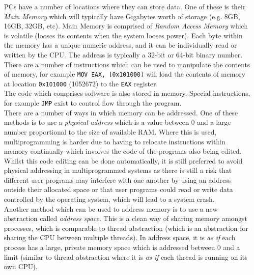 
PCs have a number of locations where they can store data. One of these is their \textit{Main Memory} which will typically have Gigabytes worth of storage (e.g. 8GB, 16GB, 32GB, etc). Main Memory is comprised of \textit{Random Access Memory} which is volatile (looses its contents when the system looses power). Each byte within the memory has a unique numeric address, and it can be individually read or written by the CPU. The address is typically a 32-bit or 64-bit binary number.\\

There are a number of instructions which can be used to manipulate the contents of memory, for example \verb|MOV EAX, [0x101000]| will load the contents of memory at location \verb|0x101000| (1052672) to the \verb|EAX| register.\\

The code which comprises software is also stored in memory. Special instructions, for example \verb|JMP| exist to control flow through the program.\\

There are a number of ways in which memory can be addressed. One of these methods is to use a \textit{physical address} which is a value between 0 and a large number proportional to the size of available RAM. Where this is used, multiprogramming is harder due to having to relocate instructions within memory continually which involves the code of the programs also being edited. Whilst this code editing can be done automatically, it is still preferred to avoid physical addressing in multiprogrammed systems as there is still a risk that different user programs may interfere with one another by using an address outside their allocated space or that user programs could read or write data controlled by the operating system, which will lead to a system crash.\\

Another method which can be used to address memory is to use a new abstraction called \textit{address space}. This is a clean way of sharing memory amongst processes, which is comparable to thread abstraction (which is an abstraction for sharing the CPU between multiple threads). In address space, it is \textit{as if} each process has a large, private memory space which is addressed between 0 and a limit (similar to thread abstraction where it is \textit{as if} each thread is running on its own CPU).\\

